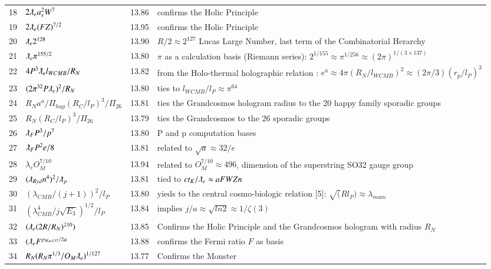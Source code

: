 \documentclass[a4paper,9pt]{article}
\begin{document}
\begin{appendix}
\begin{table}
\begin{tabular}{llll}
    18 & $2\lambdabar_{e} a_s^2 W^7$ & 13.86 & confirms the Holic Principle \\
    19 & $2\lambdabar_{e} (FZ)^{7/2}$ & 13.95 & confirms the Holic Principle \\
    20 & $\lambdabar_{e} 2^{128}$ & 13.90 & $R/2 \approx 2^{127}$ Lucas Large Number, last term of the Combinatorial Herarchy\\
    21 & $\lambdabar_{e} \pi^{155/2}$ & 13.80 & $\pi$ as a calculation basis (Riemann series): $2^{1/155} \approx \pi^{1/256} \approx (2\pi)^{1/(3\times 137)}$ \\
    22 & $4P^3\lambdabar_{e} l_{WCMB} /R_N$ & 13.82 & from the Holo-thermal holographic relation : $e^a \approx 4\pi (R_N/l_{WCMB} )^2 \approx (2\pi /3) (r_p/l_P)^3$  \\
    23 & $(2\pi^{32}P\lambdabar_{e})^2 /R_N$ & 13.80 & ties to $l_{WCMB}/l_P \approx \pi^{64}$ \\        
    24 & $R_N a^a/\Pi_{hap} (R_{C}/l_P)^3/\Pi_{26}$ & 13.81 & ties the Grandcosmos hologram radius to the 20 happy family sporadic groups \\  
    25 & $R_N (R_{C}/l_P)^3/\Pi_{26}$ & 13.79 & ties the Grandcosmos to the 26 sporadic groups \\   
    26 & $\lambdabar_{F} P^3 /p^7$ & 13.80 & P and p computation bases \\      
    27 & $\lambdabar_{F} P^2 e/8$ & 13.81 &  related to $\sqrt a  \approx 32/e$ \\     
    28 &  $\lambda_{e} O_M^{7/10}$ & 13.94 &  related to $O_M^{7/10} \approx 496$, dimension of the superstring SO32 gauge group  \\
    29 & $(\lambdabar_{Ryd} n^{4})^2/\lambdabar_p$ & 13.81 & tied to $ct_K/\lambdabar_e \approx aFWZn$ \\ 
    30 & $(\lambda_{CMB}/(j+1))^2/l_P$ & 13.80 & yieds to the central cosmo-biologic relation [5]: $\sqrt(Rl_P) \approx \lambda_{mam}$ \\
    31 & $(\lambda_{CMB}^4/j\sqrt{E_3})^{1/2}/l_P$ & 13.84 & implies $j/a \approx \sqrt{ln2} \approx 1/\zeta(3)$\\ 
    32 & $(\lambdabar_{e} (2R/R_N)^{210})$ & 13.85 & Confirms the Holic Principle and the  Grandcosmos hologram with radius $R_N$  \\
     33 & $(\lambdabar_{e} F^{p_{W, a, 137}/2a}$ & 13.88 & confirms the Fermi ratio $F$ as basis  \\
    34 & $R_N(R_N \pi^{1/3}/O_M\lambdabar_{e})^{1/127}$ & 13.77 & Confirms the Monster  \\

\end{tabular}
\end{table}
\end{appendix}
\end{document}
